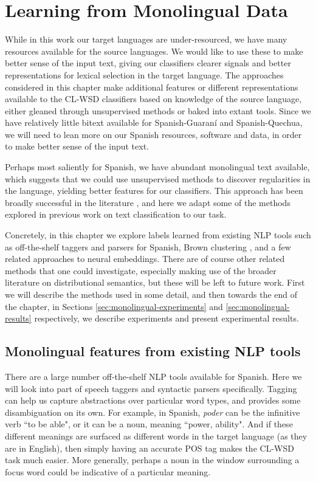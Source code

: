 \chapter{Learning from Monolingual Data}
\label{chap:monolingual}
While in this work our target languages are under-resourced, we have many
resources available for the source languages. We would like to use these to
make better sense of the input text, giving our classifiers clearer signals and
better representations for lexical selection in the target language. The
approaches considered in this chapter make additional features or different
representations available to the CL-WSD classifiers based on knowledge of the
source language, either gleaned through unsupervised methods or baked into
extant tools. Since we have relatively little bitext available for
Spanish-Guaraní and Spanish-Quechua, we will need to lean more on our Spanish
resources, software and data, in order to make better sense of the input text.

Perhaps most saliently for Spanish, we have abundant monolingual text
available, which suggests that we could use unsupervised methods to discover
regularities in the language, yielding better features for our classifiers.
This approach has been broadly successful in the literature
\cite{turian-ratinov-bengio:2010:ACL,baroni2014don}, and here we adapt some of
the methods explored in previous work on text classification to our task.

Concretely, in this chapter we explore labels learned from existing NLP tools
such as off-the-shelf taggers and parsers for Spanish, Brown clustering
\cite{brown1992class}, and a few related approaches to neural embeddings. There
are of course other related methods that one could investigate, especially
making use of the broader literature on distributional semantics, but these
will be left to future work. First we will describe the methods used in some
detail, and then towards the end of the chapter, in Sections
\ref{sec:monolingual-experiments} and \ref{sec:monolingual-results}
respectively, we describe experiments and present experimental results.

\section{Monolingual features from existing NLP tools}
There are a large number off-the-shelf NLP tools available for Spanish. Here we
will look into part of speech taggers and syntactic parsers specifically.
Tagging can help us capture abstractions over particular word types, and
provides some disambiguation on its own. For example, in Spanish, \emph{poder}
can be the infinitive verb ``to be able", or it can be a noun, meaning ``power,
ability". And if these different meanings are surfaced as different words in
the target language (as they are in English), then simply having an accurate
POS tag makes the CL-WSD task much easier. More generally, perhaps a noun in
the window surrounding a focus word could be indicative of a particular
meaning.

